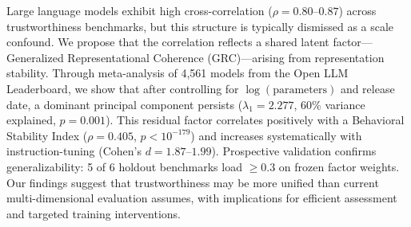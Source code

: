 Large language models exhibit high cross-correlation ($\rho = 0.80$--$0.87$) across trustworthiness benchmarks, but this structure is typically dismissed as a scale confound. We propose that the correlation reflects a shared latent factor---Generalized Representational Coherence (GRC)---arising from representation stability. Through meta-analysis of 4,561 models from the Open LLM Leaderboard, we show that after controlling for $\log(\text{parameters})$ and release date, a dominant principal component persists ($\lambda_1 = 2.277$, 60\% variance explained, $p = 0.001$). This residual factor correlates positively with a Behavioral Stability Index ($\rho = 0.405$, $p < 10^{-179}$) and increases systematically with instruction-tuning (Cohen's $d = 1.87$--$1.99$). Prospective validation confirms generalizability: 5 of 6 holdout benchmarks load $\geq 0.3$ on frozen factor weights. Our findings suggest that trustworthiness may be more unified than current multi-dimensional evaluation assumes, with implications for efficient assessment and targeted training interventions.
